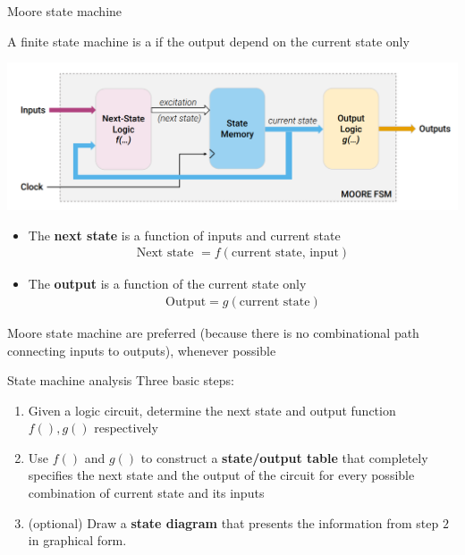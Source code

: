\begin{parag}{Moore state machine}
    \begin{definition}
    A finite state machine is a  if the output depend on the current state only
    \end{definition}
    \begin{center}
        \includegraphics[scale=0.5]{112025-06-20.png}
    \end{center}
    \begin{itemize}
        \item The \textbf{next state} is a function of inputs and current state
            \begin{align*} \text{Next state } =  f\left(\text{current state, input}\right) \end{align*}
        \item The \textbf{output} is a function of the current state only
            \begin{align*} \text{Output} =  g\left(\text{current state}\right) \end{align*}
    \end{itemize}
    \begin{framedremark}
    Moore state machine are preferred (because there is no combinational path connecting inputs to outputs), whenever possible
    \end{framedremark}
    
    
    
\end{parag}


\begin{parag}{State machine analysis}
    Three basic steps:
    \begin{enumerate}
        \item Given a logic circuit, determine the next state and output function $f\left(\right), g\left(\right)$ respectively
        \item Use $f\left(\right)$ and $g\left(\right)$ to construct a \textbf{state/output table} that completely specifies the next state and the output of the circuit for every possible combination of current state and its inputs
        \item (optional) Draw a \textbf{state diagram} that presents the information from step $2$ in graphical form.
    \end{enumerate}
    
    
\end{parag}


